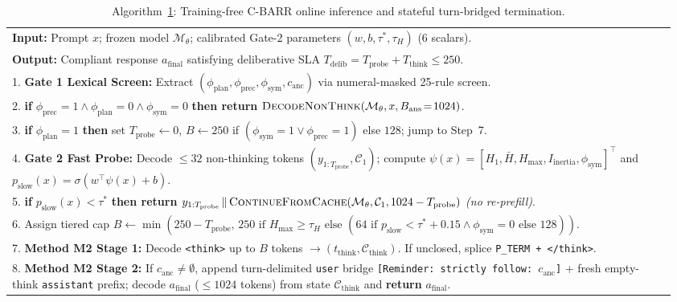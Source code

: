 \documentclass{article}
\begin{document}
\begin{table}[h]
\centering
\caption{Algorithm~\ref{alg:cbarr}: Training-free C-BARR online inference and stateful turn-bridged termination.}
\label{alg:cbarr}
\small
\begin{tabular}{p{0.96\linewidth}}
\toprule
\textbf{Input:} Prompt $x$; frozen model $\mathcal{M}_\theta$; calibrated Gate-2 parameters $(w, b, \tau^*, \tau_H)$ ($6$ scalars). \\
\textbf{Output:} Compliant response $a_{\text{final}}$ satisfying deliberative SLA $T_{\text{delib}} = T_{\text{probe}} + T_{\text{think}} \le 250$. \\
\midrule
1. \textbf{Gate 1 Lexical Screen:} Extract $(\phi_{\text{plan}}, \phi_{\text{prec}}, \phi_{\text{sym}}, c_{\text{anc}})$ via numeral-masked 25-rule screen. \\
2. \textbf{if} $\phi_{\text{prec}} = 1 \land \phi_{\text{plan}} = 0 \land \phi_{\text{sym}} = 0$ \textbf{then return} $\textsc{DecodeNonThink}(\mathcal{M}_\theta, x, B_{\text{ans}}\!=\!1024)$. \\
3. \textbf{if} $\phi_{\text{plan}} = 1$ \textbf{then} set $T_{\text{probe}} \leftarrow 0$, $B \leftarrow 250$ if $(\phi_{\text{sym}}\!=\!1 \lor \phi_{\text{prec}}\!=\!1)$ else $128$; jump to Step~7. \\
4. \textbf{Gate 2 Fast Probe:} Decode $\le 32$ non-thinking tokens $(y_{1:T_{\text{probe}}}, \mathcal{C}_1)$; compute $\psi(x) = [H_1, \bar{H}, H_{\max}, I_{\text{inertia}}, \phi_{\text{sym}}]^\top$ and $p_{\text{slow}}(x) = \sigma(w^\top \psi(x) + b)$. \\
5. \textbf{if} $p_{\text{slow}}(x) < \tau^*$ \textbf{then return} $y_{1:T_{\text{probe}}} \,\|\, \textsc{ContinueFromCache}(\mathcal{M}_\theta, \mathcal{C}_1, 1024 - T_{\text{probe}})$ \emph{(no re-prefill)}. \\
6. Assign tiered cap $B \leftarrow \min(250 - T_{\text{probe}},\, 250 \text{ if } H_{\max} \ge \tau_H \text{ else } (64 \text{ if } p_{\text{slow}} < \tau^* + 0.15 \land \phi_{\text{sym}}\!=\!0 \text{ else } 128))$. \\
7. \textbf{Method M2 Stage 1:} Decode \texttt{<think>} up to $B$ tokens $\to (t_{\text{think}}, \mathcal{C}_{\text{think}})$. If unclosed, splice \texttt{P\_TERM + </think>}. \\
8. \textbf{Method M2 Stage 2:} If $c_{\text{anc}} \neq \emptyset$, append turn-delimited \texttt{user} bridge \texttt{[Reminder: strictly follow: $c_{\text{anc}}$]} + fresh empty-think \texttt{assistant} prefix; decode $a_{\text{final}}$ ($\le 1024$ tokens) from state $\mathcal{C}_{\text{think}}$ and \textbf{return} $a_{\text{final}}$. \\
\bottomrule
\end{tabular}
\end{table}
\end{document}
